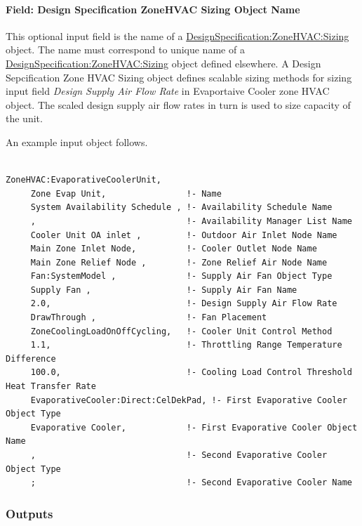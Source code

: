 \paragraph{Field: Design Specification ZoneHVAC Sizing Object Name}\label{field-design-specification-zonehvac-sizing-object-name-4}

This optional input field is the name of a \hyperref[designspecificationzonehvacsizing]{DesignSpecification:ZoneHVAC:Sizing} object. The name must correspond to unique name of a \hyperref[designspecificationzonehvacsizing]{DesignSpecification:ZoneHVAC:Sizing} object defined elsewhere. A Design Sepcification Zone HVAC Sizing object defines scalable sizing methods for sizing input field \emph{Design Supply Air Flow Rate} in Evaportaive Cooler zone HVAC object. The scaled design supply air flow rates in turn is used to size capacity of the unit.

An example input object follows.

\begin{lstlisting}

ZoneHVAC:EvaporativeCoolerUnit,
     Zone Evap Unit,                !- Name
     System Availability Schedule , !- Availability Schedule Name
     ,                              !- Availability Manager List Name
     Cooler Unit OA inlet ,         !- Outdoor Air Inlet Node Name
     Main Zone Inlet Node,          !- Cooler Outlet Node Name
     Main Zone Relief Node ,        !- Zone Relief Air Node Name
     Fan:SystemModel ,              !- Supply Air Fan Object Type
     Supply Fan ,                   !- Supply Air Fan Name
     2.0,                           !- Design Supply Air Flow Rate
     DrawThrough ,                  !- Fan Placement
     ZoneCoolingLoadOnOffCycling,   !- Cooler Unit Control Method
     1.1,                           !- Throttling Range Temperature Difference
     100.0,                         !- Cooling Load Control Threshold Heat Transfer Rate
     EvaporativeCooler:Direct:CelDekPad, !- First Evaporative Cooler Object Type
     Evaporative Cooler,            !- First Evaporative Cooler Object Name
     ,                              !- Second Evaporative Cooler Object Type
     ;                              !- Second Evaporative Cooler Name
\end{lstlisting}

\subsubsection{Outputs}\label{outputs-4-021}

